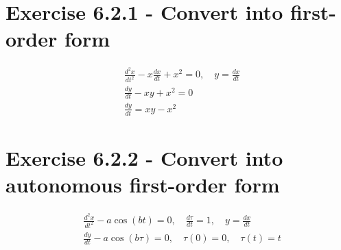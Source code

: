 \documentclass{article}
\begin{document}
	\section*{Exercise 6.2.1 - Convert into first-order form}
	\begin{align}
		&\frac{d^2x}{dt^2} - x \frac{dx}{dt} + x^2 = 0, \quad y = \frac{dx}{dt} \\
		&\frac{dy}{dt} - xy + x^2 = 0 \\
		&\frac{dy}{dt} = xy - x^2
	\end{align}
	
	\section*{Exercise 6.2.2 - Convert into autonomous first-order form}
	\begin{align}
		&\frac{d^2x}{dt^2} - a\cos(bt) = 0, \quad \frac{d\tau}{dt}=1, \quad y = \frac{dx}{dt} \\
		&\frac{dy}{dt} - a\cos(b\tau) = 0, \quad \tau(0) = 0, \quad \tau(t)=t
	\end{align}
\end{document}
